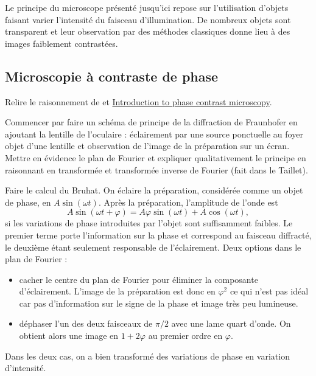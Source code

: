 \begin{transition}
Le principe du microscope présenté jusqu'ici repose sur l'utilisation d'objets faisant varier l'intensité du faisceau d'illumination.
De nombreux objets sont transparent et leur observation par des méthodes classiques donne lieu à des images faiblement contrastées.
\end{transition}

\subsection{Microscopie à contraste de phase}

Relire le raisonnement de \cite{Kastler1948} et \href{https://www.microscopyu.com/techniques/phase-contrast/introduction-to-phase-contrast-microscopy}{Introduction to phase contrast microscopy}.

Commencer par faire un schéma de principe de la diffraction de Fraunhofer en ajoutant la lentille de l'oculaire \cite{Faget1962} : éclairement par une source ponctuelle au foyer objet d'une lentille et observation de l'image de la préparation sur un écran.
Mettre en évidence le plan de Fourier et expliquer qualitativement le principe en raisonnant en transformée et transformée inverse de Fourier (fait dans le Taillet).

Faire le calcul du Bruhat.
On éclaire la préparation, considérée comme un objet de phase, en $A\sin(\omega t)$.
Après la préparation, l'amplitude de l'onde est 
\begin{equation}
A\sin(\omega t +\varphi) = A\varphi\sin(\omega t) + A\cos(\omega t),
\end{equation}
si les variations de phase introduites par l'objet sont suffisamment faibles.
Le premier terme porte l'information sur la phase et correspond au faisceau diffracté, le deuxième étant seulement responsable de l'éclairement.
Deux options dans le plan de Fourier :
\begin{itemize}
\item cacher le centre du plan de Fourier pour éliminer la composante d'éclairement.
L'image de la préparation est donc en $\varphi^2$ ce qui n'est pas idéal car pas d'information sur le signe de la phase et image très peu lumineuse.
\item déphaser l'un des deux faisceaux de $\pi/2$ avec une lame quart d'onde.
On obtient alors une image en $1+2\varphi$ au premier ordre en $\varphi$.
\end{itemize}
Dans les deux cas, on a bien transformé des variations de phase en variation d'intensité.


